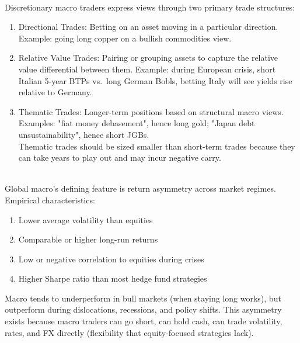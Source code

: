 \begin{remark} \\
Discretionary macro traders express views through two primary trade structures:
\begin{enumerate}[label=\roman*.]
\setlength{\itemsep}{0pt}
\item Directional Trades: Betting on an asset moving in a particular direction. Example: going long copper on a bullish commodities view.
\item Relative Value Trades: Pairing or grouping assets to capture the relative value differential between them. Example: during European crisis, short Italian 5-year BTPs vs.\ long German Bobls, betting Italy will see yields rise relative to Germany.
\item Thematic Trades: Longer-term positions based on structural macro views.\\
Examples: "fiat money debasement", hence long gold; "Japan debt unsustainability", hence short JGBs.\\
Thematic trades should be sized smaller than short-term trades because they can take years to play out and may incur negative carry.
\end{enumerate}
\end{remark}

\begin{remark} \\
Global macro's defining feature is return asymmetry across market regimes. Empirical characteristics:
\begin{enumerate}[label=\roman*.]
\setlength{\itemsep}{0pt}
\item Lower average volatility than equities
\item Comparable or higher long-run returns
\item Low or negative correlation to equities during crises
\item Higher Sharpe ratio than most hedge fund strategies
\end{enumerate}
Macro tends to underperform in bull markets (when staying long works), but outperform during dislocations, recessions, and policy shifts. This asymmetry exists because macro traders can go short, can hold cash, can trade volatility, rates, and FX directly (flexibility that equity-focused strategies lack).
\end{remark}

